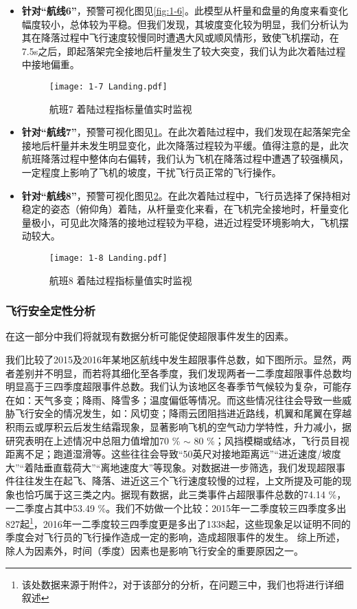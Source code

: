 \documentclass{MathorCupModeling}
\begin{document}
\begin{itemize}
		\item \textbf{针对“航线6”}，预警可视化图见\textcolor{blue}{\cref{fig:1-6}}。此模型从杆量和盘量的角度来看变化幅度较小，总体较为平稳。但我们发现，其坡度变化较为明显，我们分析认为其在降落过程中飞行速度较慢同时遭遇大风或顺风情形，致使飞机摆动，在7.5s之后，即起落架完全接地后杆量发生了较大突变，我们认为此次着陆过程中接地偏重。
		\begin{figure}[H]
			\centering
			\texttt{[image: 1-7 Landing.pdf]}
			\caption{航班7 着陆过程指标量值实时监视}
			\label{fig:1-7}
		\end{figure}
		\item \textbf{针对“航线7”}，预警可视化图见\textcolor{blue}{\cref{fig:1-7}}。在此次着陆过程中，我们发现在起落架完全接地后杆量并未发生明显变化，此次降落过程较为平缓。值得注意的是，此次航班降落过程中整体向右偏转，我们认为飞机在降落过程中遭遇了较强横风，一定程度上影响了飞机的坡度，干扰飞行员正常的飞行操作。

		\item \textbf{针对“航线8”}，预警可视化图见\textcolor{blue}{\cref{fig:1-8}}。在此次着陆过程中，飞行员选择了保持相对稳定的姿态（俯仰角）着陆，从杆量变化来看，在飞机完全接地时，杆量变化量极小，可见此次降落的接地过程较为平稳，进近过程受环境影响大，飞机摆动较大。
		\begin{figure}[H]
			\centering
			\texttt{[image: 1-8 Landing.pdf]}
			\caption{航班8 着陆过程指标量值实时监视}
			\label{fig:1-8}
		\end{figure}
	\end{itemize}
\subsubsection{飞行安全定性分析}
在这一部分中我们将就现有数据分析可能促使超限事件发生的因素。

我们比较了2015及2016年某地区航线中发生超限事件总数，如下图所示。显然，两者差别并不明显，而若将其细化至各季度，我们发现两者一二季度超限事件总数均明显高于三四季度超限事件总数。我们认为该地区冬春季节气候较为复杂，可能存在如：天气多变；降雨、降雪多；温度偏低等情况。而这些情况往往会导致一些威胁飞行安全的情况发生，如：风切变；降雨云团阻挡进近路线，机翼和尾翼在穿越积雨云或厚积云后发生结霜现象，显著影响飞机的空气动力学特性，升力减小，据研究表明在上述情况中总阻力值增加70 \% $\sim$ 80 \%；风挡模糊或结冰，飞行员目视距离不足；跑道湿滑等。这些往往会导致“50英尺对接地距离远”“进近速度/坡度大”“着陆垂直载荷大”“离地速度大”等现象。对数据进一步筛选，我们发现超限事件往往发生在起飞、降落、进近这三个飞行速度较慢的过程，上文所提及可能的现象也恰巧属于这三类之内。据现有数据，此三类事件占超限事件总数的74.14 \%，一二季度占其中53.49 \%。我们不妨做一个比较：2015年一二季度较三四季度多出827起\textcolor{blue}{\footnote{该处数据来源于附件2，对于该部分的分析，在问题三中，我们也将进行详细叙述}}，2016年一二季度较三四季度更是多出了1338起，这些现象足以证明不同的季度会对飞行员的飞行操作造成一定的影响，造成超限事件的发生。
综上所述，除人为因素外，时间（季度）因素也是影响飞行安全的重要原因之一。
\end{document}
